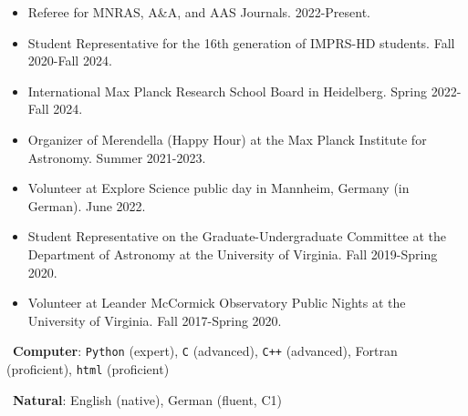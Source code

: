 \documentclass[a4paper,12pt,oneside]{article}
\begin{document}
\noindent{}

\begin{itemize}[wide, labelwidth=!, labelindent=-11pt, noitemsep]
    \item Referee for MNRAS, A\&A, and AAS Journals. 2022-Present.
    \item Student Representative for the 16th generation of IMPRS-HD students. Fall 2020-Fall 2024. 
    \item International Max Planck Research School Board in Heidelberg. Spring 2022-Fall 2024.
    \item Organizer of Merendella (Happy Hour) at the Max Planck Institute for Astronomy. Summer 2021-2023.
    \item Volunteer at Explore Science public day in Mannheim, Germany (in German). June 2022.
    \item Student Representative on the Graduate-Undergraduate Committee at the Department of Astronomy at the University of Virginia. Fall 2019-Spring 2020.
    \item Volunteer at Leander McCormick Observatory Public Nights at the University of Virginia. Fall 2017-Spring 2020.
\end{itemize}


\noindent{}

\vspace{5.5pt}

\noindent \hspace{-19pt} \faKeyboardO\ {\bf Computer}: \texttt{Python} (expert), \texttt{C} (advanced), \texttt{C++} (advanced), Fortran (proficient), \texttt{html} (proficient)

\vspace{5.5pt}

\noindent \hspace{-17pt} \faLanguage\ {\bf Natural}: English (native), German (fluent, C1) \\
\end{document}
